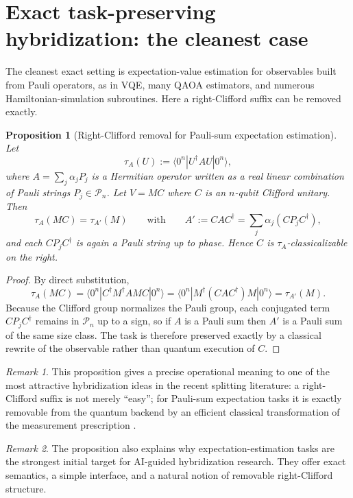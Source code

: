 \documentclass[11pt]{article}
\newtheorem{proposition}{Proposition}
\theoremstyle{remark}
\newtheorem{remark}{Remark}
\newcommand{\Pauli}{\mathcal{P}}
\begin{document}
\section{Exact task-preserving hybridization: the cleanest case}

The cleanest exact setting is expectation-value estimation for observables built from Pauli operators, as in VQE, many QAOA estimators, and numerous Hamiltonian-simulation subroutines. Here a right-Clifford suffix can be removed exactly.

\begin{proposition}[Right-Clifford removal for Pauli-sum expectation estimation]
Let
\[
\tau_A(U) := \langle 0^n | U^{\dagger} A U | 0^n \rangle,
\]
where $A = \sum_j \alpha_j P_j$ is a Hermitian operator written as a real linear combination of Pauli strings $P_j \in \Pauli_n$. Let $V = M C$ where $C$ is an $n$-qubit Clifford unitary. Then
\[
\tau_A(MC) = \tau_{A'}(M)
\qquad\text{with}\qquad
A' := C A C^{\dagger} = \sum_j \alpha_j (C P_j C^{\dagger}),
\]
and each $C P_j C^{\dagger}$ is again a Pauli string up to phase. Hence $C$ is $\tau_A$-classicalizable on the right.
\end{proposition}

\begin{proof}
By direct substitution,
\[
\tau_A(MC)
= \langle 0^n | C^{\dagger} M^{\dagger} A M C | 0^n \rangle
= \langle 0^n | M^{\dagger} (C A C^{\dagger}) M | 0^n \rangle
= \tau_{A'}(M).
\]
Because the Clifford group normalizes the Pauli group, each conjugated term $C P_j C^{\dagger}$ remains in $\Pauli_n$ up to a sign, so if $A$ is a Pauli sum then $A'$ is a Pauli sum of the same size class. The task is therefore preserved exactly by a classical rewrite of the observable rather than quantum execution of $C$.
\end{proof}

\begin{remark}
This proposition gives a precise operational meaning to one of the most attractive hybridization ideas in the recent splitting literature: a right-Clifford suffix is not merely ``easy''; for Pauli-sum expectation tasks it is exactly removable from the quantum backend by an efficient classical transformation of the measurement prescription \cite{splitting_2025}.
\end{remark}

\begin{remark}
The proposition also explains why expectation-estimation tasks are the strongest initial target for AI-guided hybridization research. They offer exact semantics, a simple interface, and a natural notion of removable right-Clifford structure.
\end{remark}
\end{document}
